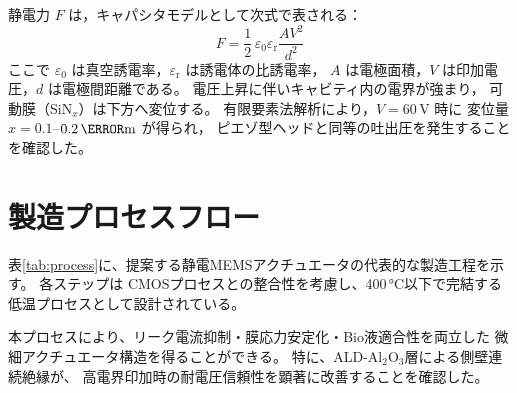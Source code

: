 \documentclass[conference]{IEEEtran}
\begin{document}
静電力 $F$ は，キャパシタモデルとして次式で表される：
\[
F = \frac{1}{2}\,\varepsilon_0 \varepsilon_{\mathrm{r}} \frac{A V^2}{d^2}
\]
ここで $\varepsilon_0$ は真空誘電率，$\varepsilon_{\mathrm{r}}$ は誘電体の比誘電率，
$A$ は電極面積，$V$ は印加電圧，$d$ は電極間距離である。
電圧上昇に伴いキャビティ内の電界が強まり，
可動膜（SiN$_x$）は下方へ変位する。
有限要素法解析により，$V=60\,\mathrm{V}$ 時に
変位量 $x=0.1$–$0.2\,\mathrm{\micro m}$ が得られ，
ピエゾ型ヘッドと同等の吐出圧を発生することを確認した。

\section{製造プロセスフロー}
表\ref{tab:process}に、提案する静電MEMSアクチュエータの代表的な製造工程を示す。
各ステップは CMOSプロセスとの整合性を考慮し、400\,°C以下で完結する低温プロセスとして設計されている。

\begin{table}[t]
\centering
\caption{静電MEMSアクチュエータの代表的製造プロセス}
\label{tab:process}
\end{table}

本プロセスにより、リーク電流抑制・膜応力安定化・Bio液適合性を両立した
微細アクチュエータ構造を得ることができる。
特に、ALD-Al$_2$O$_3$層による側壁連続絶縁が、
高電界印加時の耐電圧信頼性を顕著に改善することを確認した。
\end{document}
